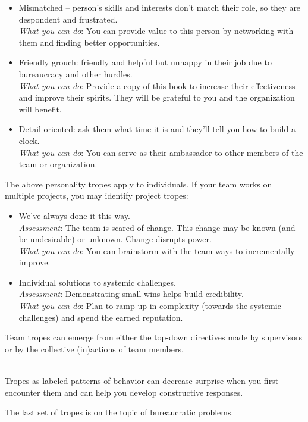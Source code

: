 \begin{itemize}
    \item Mismatched -- person's skills and interests don't match their role, so they are despondent and frustrated. \\
    \textit{What you can do}: You can provide value to this person by networking with them and finding better opportunities.
    
    \item Friendly grouch: friendly and helpful but unhappy in their job due to bureaucracy and other hurdles. \\
    \textit{What you can do}: Provide a copy of this book to increase their effectiveness and improve their spirits. They will be grateful to you and the organization will benefit.
    
    \item Detail-oriented: ask them what time it is and they'll tell you how to build a clock. \\
    \textit{What you can do}: You can serve as their ambassador to other members of the team or organization.  
\end{itemize}


The above personality tropes apply to individuals. If your team works on multiple projects, you may identify project tropes:
\begin{itemize}
    \item We've always done it this way.\\
    \textit{Assessment}: The team is scared of change. This change may be known (and be undesirable) or unknown. Change disrupts power.\\
    \textit{What you can do}: You can brainstorm with the team ways to incrementally improve. 

    \item Individual solutions to systemic challenges.\\
    \textit{Assessment}: Demonstrating small wins helps build credibility. \\
    \textit{What you can do}: Plan to ramp up in complexity (towards the systemic challenges) and spend the earned reputation.
\end{itemize}
Team tropes can emerge from either the top-down directives made by supervisors or by the collective (in)actions of team members.


\ \\


Tropes as labeled patterns of behavior can decrease surprise when you first encounter them and can help you develop constructive responses. 

The last set of tropes is on the topic of bureaucratic problems. 